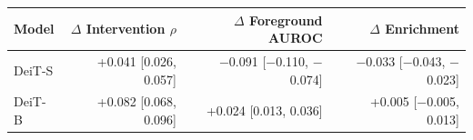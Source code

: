 \begin{tabular}{@{}lrrr@{}}
\toprule
Model & $\Delta$ Intervention $\rho$ & $\Delta$ Foreground AUROC & $\Delta$ Enrichment \\
\midrule
DeiT-S & +0.041 [0.026, 0.057] & $-$0.091 [$-$0.110, $-$0.074] & $-$0.033 [$-$0.043, $-$0.023] \\
DeiT-B & +0.082 [0.068, 0.096] & +0.024 [0.013, 0.036] & +0.005 [$-$0.005, 0.013] \\
\bottomrule
\end{tabular}
